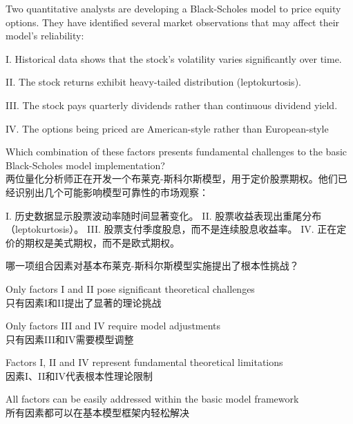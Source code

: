 \documentclass{article}
\newcounter{question} %
\begin{document}
        \begin{question}
            Two quantitative analysts are developing a Black-Scholes model to price equity options. They have identified several market observations that may affect their model's reliability:
            
            I. Historical data shows that the stock's volatility varies significantly over time.

            II. The stock returns exhibit heavy-tailed distribution (leptokurtosis).

            III. The stock pays quarterly dividends rather than continuous dividend yield.

            IV. The options being priced are American-style rather than European-style
            
            Which combination of these factors presents fundamental challenges to the basic Black-Scholes model implementation?
            \\两位量化分析师正在开发一个布莱克-斯科尔斯模型，用于定价股票期权。他们已经识别出几个可能影响模型可靠性的市场观察：
            
                I. 历史数据显示股票波动率随时间显著变化。
                II. 股票收益表现出重尾分布（leptokurtosis）。
                III. 股票支付季度股息，而不是连续股息收益率。
                IV. 正在定价的期权是美式期权，而不是欧式期权。
          
            哪一项组合因素对基本布莱克-斯科尔斯模型实施提出了根本性挑战？
            \end{question}
            
            \begin{choices}
            \item Only factors I and II pose significant theoretical challenges\\
            只有因素I和II提出了显著的理论挑战
            \item Only factors III and IV require model adjustments\\
            只有因素III和IV需要模型调整
            \item Factors I, II and IV represent fundamental theoretical limitations\\
            因素I、II和IV代表根本性理论限制
            \item All factors can be easily addressed within the basic model framework\\
            所有因素都可以在基本模型框架内轻松解决
            \end{choices}
            
\end{document}
